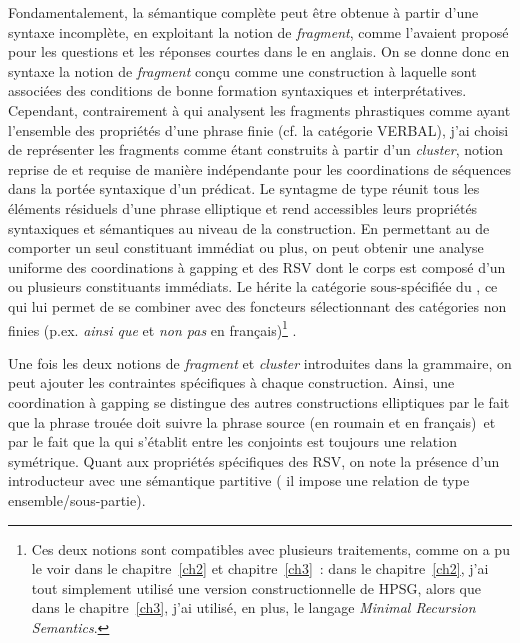 Fondamentalement, la sémantique complète peut être obtenue à partir d’une syntaxe incomplète, en exploitant la notion de \textit{fragment}, comme l’avaient proposé \citet{GinzburgEtAl2000} pour les questions et les réponses courtes dans le  en anglais. On se donne donc en syntaxe la notion de \textit{fragment} conçu comme une construction à laquelle sont associées des conditions de bonne formation syntaxiques et interprétatives. Cependant, contrairement à \citet{GinzburgEtAl2000} qui analysent les fragments phrastiques comme ayant l’ensemble des propriétés d’une phrase finie (cf. la catégorie VERBAL), j’ai choisi de représenter les fragments comme étant construits à partir d’un \textit{cluster}, notion reprise de \citet{Mouret2006,Mouret2007} et requise de manière indépendante pour les coordinations de séquences dans la portée syntaxique d’un prédicat. Le syntagme de type  réunit tous les éléments résiduels d’une phrase elliptique et rend accessibles leurs propriétés syntaxiques et sémantiques au niveau de la construction. En permettant au  de comporter un seul constituant immédiat ou plus, on peut obtenir une analyse uniforme des coordinations à gapping et des RSV dont le corps est composé d’un ou plusieurs constituants immédiats. Le  hérite la catégorie sous-spécifiée du , ce qui lui permet de se combiner avec des foncteurs sélectionnant des catégories non finies (p.ex. \textit{ainsi que} et \textit{non pas} en français)\footnote{ Ces deux notions sont compatibles avec plusieurs traitements, comme on a pu le voir dans le chapitre~\ref{ch2} et chapitre~\ref{ch3}~: dans le chapitre~\ref{ch2}, j’ai tout simplement utilisé une version constructionnelle de HPSG, alors que dans le chapitre~\ref{ch3}, j’ai utilisé, en plus, le langage \textit{Minimal Recursion Semantics}.} . 

Une fois les deux notions de \textit{fragment} et \textit{cluster} introduites dans la grammaire, on peut ajouter les contraintes spécifiques à chaque construction. Ainsi, une coordination à gapping se distingue des autres constructions elliptiques par le fait que la phrase trouée doit suivre la phrase source (en roumain et en français)~et par le fait que la  qui s’établit entre les conjoints est toujours une relation symétrique. Quant aux propriétés spécifiques des RSV, on note la présence d’un introducteur avec une sémantique partitive ({\cad} il impose une relation de type ensemble/sous-partie).

